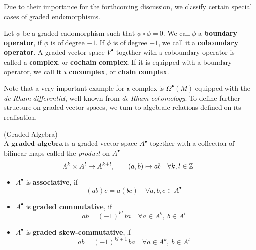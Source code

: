 Due to their importance for the forthcoming discussion, we classify certain special cases of graded endomorphisms.

\begin{definition}
  Let $\phi$ be a graded endomorphism such that $\phi \circ \phi = 0$. We call $\phi$ a \textbf{boundary operator}, if $\phi$ is of degree $-1$. If $\phi$ is of degree $+1$, we call it a \textbf{coboundary operator}. A graded vector space $V^\bullet$ together with a coboundary operator is called a \textbf{complex}, or \textbf{cochain complex}. If it is equipped with a boundary operator, we call it a \textbf{cocomplex}, or \textbf{chain complex}.
\end{definition}

Note that a very important example for a complex is $\Omega^\bullet(M)$ equipped with the \emph{de Rham differential}, well known from \emph{de Rham cohomology}. To define further structure on graded vector spaces, we turn to algebraic relations defined on its realisation.

\begin{definition} (Graded Algebra)\\
  A \textbf{graded algebra} is a graded vector space $A^\bullet$ together with a collection of bilinear maps called the \emph{product} on $A^\bullet$
  $$ A^k \times A^l \rightarrow A^{k+l}, \quad \quad (a,b) \mapsto ab \quad  \forall k,l \in \mathbb{Z}$$
  \begin{itemize}
    \item $A^\bullet$ is \textbf{associative}, if
    $$ (ab)c = a(bc) \quad \forall a,b,c \in A^\bullet $$

    \item $A^\bullet$ is \textbf{graded commutative}, if
    $$ ab = (-1)^{kl}\ ba \quad \forall a \in A^k, \ b\in A^l $$

    \item $A^\bullet$ is \textbf{graded skew-commutative}, if
    $$ ab = (-1)^{kl+1}\ ba \quad \forall a \in A^k, \ b\in A^l $$
  \end{itemize}
\end{definition}

